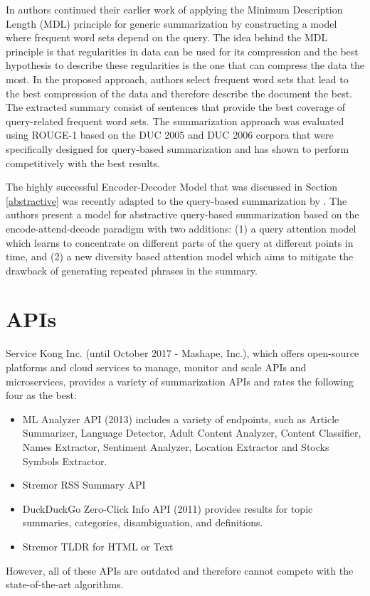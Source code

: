 \documentclass[11pt,a4paper,onecolumn]{article}
\begin{document}
In \cite{litvak2017query} authors continued their earlier work \cite{litvak2015krimping} of applying the Minimum Description Length (MDL) principle for generic summarization by constructing a model where frequent word sets depend on the query.
The idea behind the MDL principle is that regularities in data can be used for its compression and the best hypothesis to describe these regularities is the one that can compress the data the most.
In the proposed approach, authors select frequent word sets that lead to the best compression of the data and therefore describe the document the best.
The extracted summary consist of sentences that provide the best coverage of query-related frequent word sets.
The summarization approach was evaluated using ROUGE-1 based on the DUC 2005 and DUC 2006 corpora that were specifically designed for query-based summarization and has shown to perform competitively with the best results.

The highly successful Encoder-Decoder Model that was discussed in Section \ref{abstractive} was recently adapted to the query-based summarization by \cite{nema2017diversity}.
The authors present a model for abstractive query-based summarization based on the encode-attend-decode paradigm with two additions: (1) a query attention model which learns to concentrate on different parts of the query at different points in time, and (2) a new diversity based attention model which aims to mitigate the drawback of generating repeated phrases in the summary.

\section{APIs}
Service Kong Inc. (until October 2017 - Mashape, Inc.), which offers open-source platforms and cloud services to manage, monitor and scale APIs and microservices, provides a variety of summarization APIs and rates the following four as the best:
\begin{itemize}
\item ML Analyzer API (2013) includes a variety of endpoints, such as Article Summarizer, Language Detector, Adult Content Analyzer, Content Classifier, Names Extractor, Sentiment Analyzer, Location Extractor and Stocks Symbols Extractor.
\item Stremor RSS Summary API
\item DuckDuckGo Zero-Click Info API (2011) provides results for topic summaries, categories, disambiguation, and definitions.
\item Stremor TLDR for HTML or Text
\end{itemize}
However, all of these APIs are outdated and therefore cannot compete with the state-of-the-art algorithms.
\end{document}
